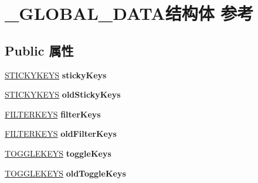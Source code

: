 \hypertarget{struct___g_l_o_b_a_l___d_a_t_a}{}\section{\+\_\+\+G\+L\+O\+B\+A\+L\+\_\+\+D\+A\+T\+A结构体 参考}
\label{struct___g_l_o_b_a_l___d_a_t_a}
\subsection*{Public 属性}
\begin{DoxyCompactItemize}
\item 
\mbox{\label{struct___g_l_o_b_a_l___d_a_t_a_a39450b7b64ee6213cbd36bcb4cb798a9}} 
\hyperlink{structtag_s_t_i_c_k_y_k_e_y_s}{S\+T\+I\+C\+K\+Y\+K\+E\+YS} {\bfseries sticky\+Keys}
\item 
\mbox{\label{struct___g_l_o_b_a_l___d_a_t_a_ab62cf0bcf584b8632afed5c8764b1959}} 
\hyperlink{structtag_s_t_i_c_k_y_k_e_y_s}{S\+T\+I\+C\+K\+Y\+K\+E\+YS} {\bfseries old\+Sticky\+Keys}
\item 
\mbox{\label{struct___g_l_o_b_a_l___d_a_t_a_a862e584a455effbe95203f1cad0f0951}} 
\hyperlink{structtag_f_i_l_t_e_r_k_e_y_s}{F\+I\+L\+T\+E\+R\+K\+E\+YS} {\bfseries filter\+Keys}
\item 
\mbox{\label{struct___g_l_o_b_a_l___d_a_t_a_a0a2c33fa88948fd522fd6ede27b5fa49}} 
\hyperlink{structtag_f_i_l_t_e_r_k_e_y_s}{F\+I\+L\+T\+E\+R\+K\+E\+YS} {\bfseries old\+Filter\+Keys}
\item 
\mbox{\label{struct___g_l_o_b_a_l___d_a_t_a_a6686339b0027b0433926eac557e3bf30}} 
\hyperlink{structtag_t_o_g_g_l_e_k_e_y_s}{T\+O\+G\+G\+L\+E\+K\+E\+YS} {\bfseries toggle\+Keys}
\item 
\mbox{\label{struct___g_l_o_b_a_l___d_a_t_a_acbc05d7ee4ecd7ccd45abb6c154badf3}} 
\hyperlink{structtag_t_o_g_g_l_e_k_e_y_s}{T\+O\+G\+G\+L\+E\+K\+E\+YS} {\bfseries old\+Toggle\+Keys}
\item 
\mbox{\label{struct___g_l_o_b_a_l___d_a_t_a_aaee0aef04d93fd25e7479b275eff6ded}} 

\end{DoxyCompactItemize}
